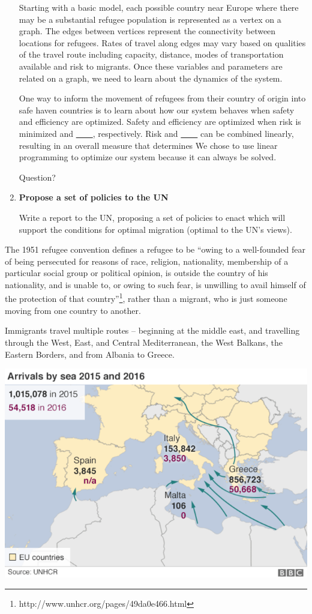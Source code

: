 \documentclass{article}
\begin{document}
\begin{enumerate}
    Starting with a basic model, each possible country near Europe where there may be a substantial refugee population is represented as a vertex on a graph. The edges between vertices represent the connectivity between locations for refugees. Rates of travel along edges may vary based on qualities of the travel route including capacity, distance, modes of transportation available and risk to migrants. Once these variables and parameters are related on a graph, we need to learn about the dynamics of the system.


    One way to inform the movement of refugees from their country of origin into safe haven countries is to learn about how our system behaves when safety and efficiency are optimized. Safety and efficiency are optimized when risk is minimized and \underline{\ \ \ \ }, respectively. Risk and \underline{\ \ \ \ } can be combined linearly, resulting in an overall measure that determines We chose to use linear programming to optimize our system because it can always be solved. 

    Question?

    \item {\bf Propose a set of policies to the UN}

    Write a report to the UN, proposing a set of policies to enact which will support the conditions for optimal migration (optimal to the UN's views).
\end{enumerate}

The 1951 refugee convention defines a refugee to be ``owing to a well-founded fear of being persecuted for reasons of race, religion, nationality, membership of a particular social group or political opinion, is outside the country of his nationality, and is unable to, or owing to such fear, is unwilling to avail himself of the protection of that country''\footnote{http://www.unhcr.org/pages/49da0e466.html}, rather than a migrant, who is just someone moving from one country to another.

Immigrants travel multiple routes -- beginning at the middle east, and travelling through the West, East, and Central Mediterranean, the West Balkans, the Eastern Borders, and from Albania to Greece.

\begin{center}
\includegraphics[scale=0.5]{travelmap}
\end{center}
\end{document}
